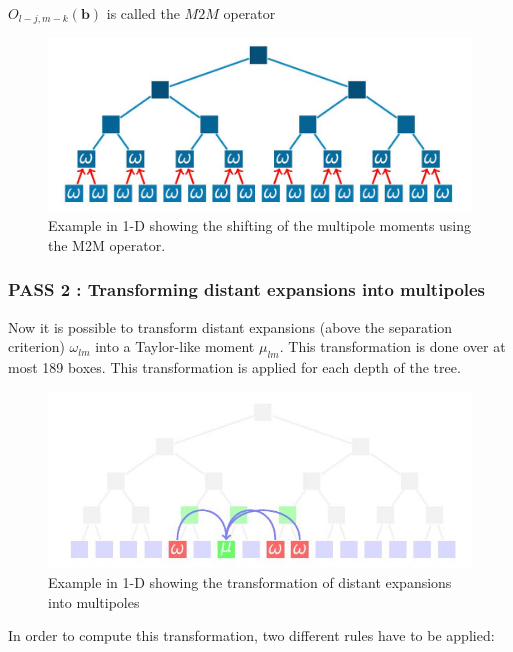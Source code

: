 \documentclass[11pt,twoside,a4paper]{report}
\begin{document}
   $O_{l-j,m-k}(\textbf{b})$ is called the $M2M$ operator
   
   \begin{figure}[H]
   \includegraphics[scale=0.4]{ShiftMultipole}
    \centering 
    \caption{Example in 1-D showing the shifting of the multipole moments using the M2M operator. }
    \label{fig:multipole}
   \end{figure}
   
   
   	\subsubsection{PASS 2 : Transforming distant expansions into multipoles}
   	
   	Now it is possible to transform distant expansions (above the separation criterion) $\omega_{lm}$ into a Taylor-like moment $\mu_{lm}$. This transformation is done over at most 189 boxes. This transformation is applied for each depth of the tree.  
   	
   	
 \begin{figure}[H]
 	\label{fig:M2L}
   \includegraphics[scale=0.8]{transformExpansions1}
    \centering 
    \caption{Example in 1-D showing the transformation of distant expansions into multipoles}
    
   \end{figure}
   
	In order to compute this transformation, two different rules have to be applied:
	
\end{document}
